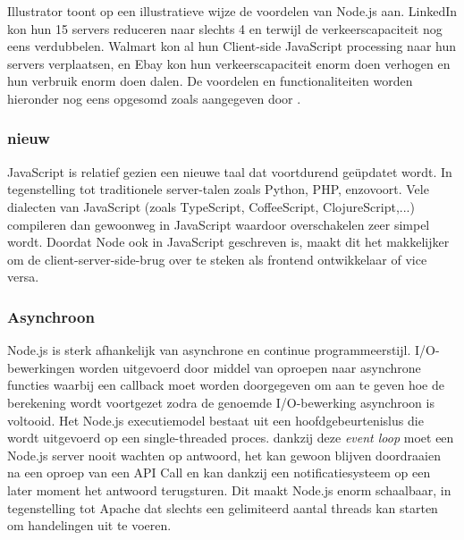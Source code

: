 Illustrator \textcite{Mehmet2016} toont op een illustratieve wijze de voordelen van Node.js aan. LinkedIn kon hun 15 servers reduceren naar slechts 4 en terwijl de verkeerscapaciteit nog eens verdubbelen. Walmart kon al hun Client-side JavaScript processing naar hun servers verplaatsen, en Ebay kon hun verkeerscapaciteit enorm doen verhogen en hun verbruik enorm doen dalen. De voordelen en functionaliteiten worden hieronder nog eens opgesomd zoals aangegeven door \textcite{Chandrayan2017}.

\subsubsection{nieuw}
\label{sec:new}

JavaScript is relatief gezien een nieuwe taal dat voortdurend geüpdatet wordt. In tegenstelling tot traditionele server-talen zoals Python, PHP, enzovoort. Vele dialecten van JavaScript (zoals TypeScript, CoffeeScript, ClojureScript,...) compileren dan gewoonweg in JavaScript waardoor overschakelen zeer simpel wordt. Doordat Node ook in JavaScript geschreven is, maakt dit het makkelijker om de client-server-side-brug over te steken als frontend ontwikkelaar of vice versa. \autocite{ExpressMozilla}

\subsubsection{Asynchroon}
\label{sec:async}

Node.js is sterk afhankelijk van asynchrone en continue programmeerstijl. I/O-bewerkingen worden uitgevoerd door middel van oproepen naar asynchrone functies waarbij een callback moet worden doorgegeven om aan te geven hoe de berekening wordt voortgezet zodra de genoemde I/O-bewerking asynchroon is voltooid. Het Node.js executiemodel bestaat uit een hoofdgebeurtenislus die wordt uitgevoerd op een single-threaded proces. dankzij deze \textit{event loop} moet een Node.js server nooit wachten op antwoord, het kan gewoon blijven doordraaien na een oproep van een API Call en kan dankzij een notificatiesysteem op een later moment het antwoord terugsturen. Dit maakt Node.js enorm schaalbaar, in tegenstelling tot Apache dat slechts een gelimiteerd aantal threads kan starten om handelingen uit te voeren.

